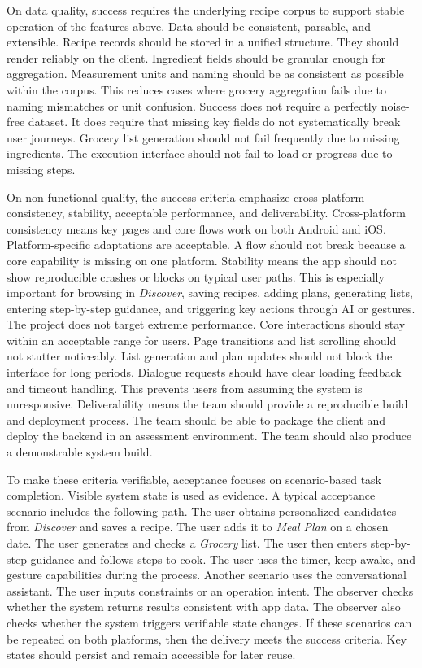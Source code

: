 \documentclass[journal]{IEEEtran}
\begin{document}
On data quality, success requires the underlying recipe corpus to support stable operation of the features above. Data should be consistent, parsable, and extensible. Recipe records should be stored in a unified structure. They should render reliably on the client. Ingredient fields should be granular enough for aggregation. Measurement units and naming should be as consistent as possible within the corpus. This reduces cases where grocery aggregation fails due to naming mismatches or unit confusion. Success does not require a perfectly noise-free dataset. It does require that missing key fields do not systematically break user journeys. Grocery list generation should not fail frequently due to missing ingredients. The execution interface should not fail to load or progress due to missing steps.

On non-functional quality, the success criteria emphasize cross-platform consistency, stability, acceptable performance, and deliverability. Cross-platform consistency means key pages and core flows work on both Android and iOS. Platform-specific adaptations are acceptable. A flow should not break because a core capability is missing on one platform. Stability means the app should not show reproducible crashes or blocks on typical user paths. This is especially important for browsing in \textit{Discover}, saving recipes, adding plans, generating lists, entering step-by-step guidance, and triggering key actions through AI or gestures. The project does not target extreme performance. Core interactions should stay within an acceptable range for users. Page transitions and list scrolling should not stutter noticeably. List generation and plan updates should not block the interface for long periods. Dialogue requests should have clear loading feedback and timeout handling. This prevents users from assuming the system is unresponsive. Deliverability means the team should provide a reproducible build and deployment process. The team should be able to package the client and deploy the backend in an assessment environment. The team should also produce a demonstrable system build.

To make these criteria verifiable, acceptance focuses on scenario-based task completion. Visible system state is used as evidence. A typical acceptance scenario includes the following path. The user obtains personalized candidates from \textit{Discover} and saves a recipe. The user adds it to \textit{Meal Plan} on a chosen date. The user generates and checks a \textit{Grocery} list. The user then enters step-by-step guidance and follows steps to cook. The user uses the timer, keep-awake, and gesture capabilities during the process. Another scenario uses the conversational assistant. The user inputs constraints or an operation intent. The observer checks whether the system returns results consistent with app data. The observer also checks whether the system triggers verifiable state changes. If these scenarios can be repeated on both platforms, then the delivery meets the success criteria. Key states should persist and remain accessible for later reuse.
\end{document}
